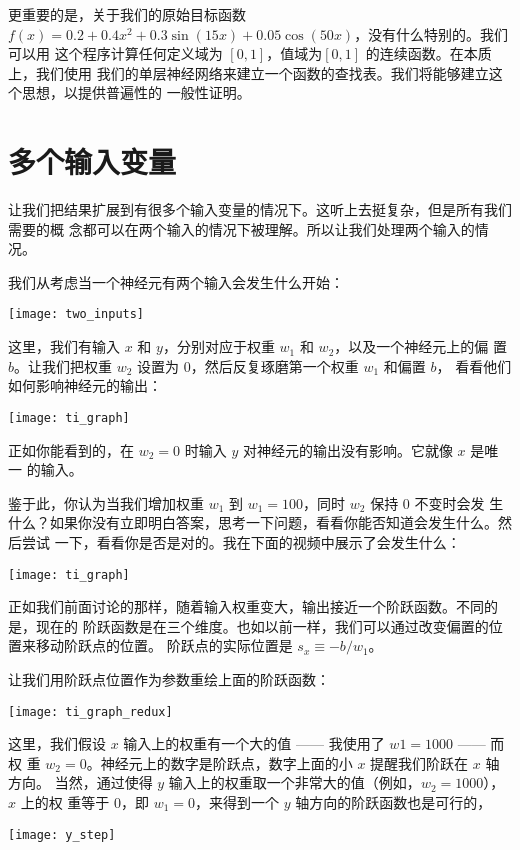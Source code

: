 更重要的是，关于我们的原始目标函数
$f(x) = 0.2+0.4 x^2+0.3 \sin(15 x) + 0.05 \cos(50 x)$，没有什么特别的。我们可以用
这个程序计算任何定义域为 $[0, 1]$，值域为$[0, 1]$ 的连续函数。在本质上，我们使用
我们的单层神经网络来建立一个函数的查找表。我们将能够建立这个思想，以提供普遍性的
一般性证明。

\section{多个输入变量}
\label{sec:many_input_variables}

让我们把结果扩展到有很多个输入变量的情况下。这听上去挺复杂，但是所有我们需要的概
念都可以在两个输入的情况下被理解。所以让我们处理两个输入的情况。

我们从考虑当一个神经元有两个输入会发生什么开始：
\begin{center}
  \texttt{[image: two\_inputs]}
\end{center}

这里，我们有输入 $x$ 和 $y$，分别对应于权重 $w_1$ 和 $w_2$，以及一个神经元上的偏
置 $b$。让我们把权重 $w_2$ 设置为 $0$，然后反复琢磨第一个权重 $w_1$ 和偏置 $b$，
看看他们如何影响神经元的输出：
\begin{center}
  \texttt{[image: ti\_graph]}
\end{center}

正如你能看到的，在 $w_2 = 0$ 时输入 $y$ 对神经元的输出没有影响。它就像 $x$ 是唯一
的输入。

鉴于此，你认为当我们增加权重 $w_1$ 到 $w_1 = 100$，同时 $w_2$ 保持 $0$ 不变时会发
生什么？如果你没有立即明白答案，思考一下问题，看看你能否知道会发生什么。然后尝试
一下，看看你是否是对的。我在下面的视频中展示了会发生什么：
\begin{center}
  \texttt{[image: ti\_graph]}
\end{center}

正如我们前面讨论的那样，随着输入权重变大，输出接近一个阶跃函数。不同的是，现在的
阶跃函数是在三个维度。也如以前一样，我们可以通过改变偏置的位置来移动阶跃点的位置。
阶跃点的实际位置是 $s_x \equiv -b / w_1$。

让我们用阶跃点位置作为参数重绘上面的阶跃函数：
\begin{center}
  \texttt{[image: ti\_graph\_redux]}
\end{center}

这里，我们假设 $x$ 输入上的权重有一个大的值 —— 我使用了 $w1 = 1000$ —— 而权
重 $w_2 = 0$。神经元上的数字是阶跃点，数字上面的小 $x$ 提醒我们阶跃在 $x$ 轴方向。
当然，通过使得 $y$ 输入上的权重取一个非常大的值（例如，$w_2 = 1000$），$x$ 上的权
重等于 $0$，即 $w_1 = 0$，来得到一个 $y$ 轴方向的阶跃函数也是可行的，
\begin{center}
  \texttt{[image: y\_step]}
\end{center}

